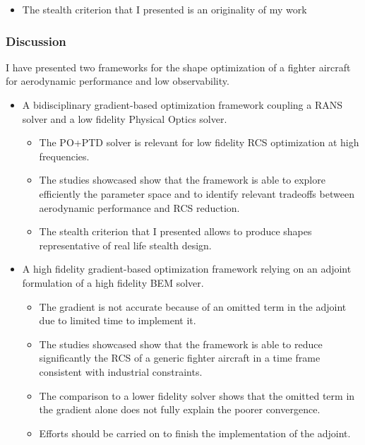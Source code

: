 \documentclass[beamer]{standalone}
\begin{document}
\begin{frame}
\begin{itemize}[label=]
\begin{itemize}[label=$\bullet$]
\begin{itemize}
                \item (12 months)
            \end{itemize}
            \item Study to showcase the framework and postprocessing of the results
            \begin{itemize}
                \item (6 months)
            \end{itemize}
        \end{itemize}
        \item The stealth criterion that I presented is an originality of my work
    \end{itemize}
\end{frame}

\begin{frame}
    \frametitle{Discussion}
    \small
    I have presented two frameworks for the shape optimization of a fighter aircraft for aerodynamic performance and low observability.
    \begin{itemize}[label=]
        \item A bidisciplinary gradient-based optimization framework coupling a RANS solver and a low fidelity Physical Optics solver.
        {
        \begin{itemize}[label=$\bullet$]
            \item The PO+PTD solver is relevant for low fidelity RCS optimization at high frequencies.
            \item The studies showcased show that the framework is able to explore efficiently the parameter space and to identify relevant tradeoffs between aerodynamic performance and RCS reduction.
            \item The stealth criterion that I presented allows to produce shapes representative of real life stealth design.
        \end{itemize}
        }
        \item A high fidelity gradient-based optimization framework relying on an adjoint formulation of a high fidelity BEM solver.
        \begin{itemize}[label=$\bullet$]
            \item The gradient is not accurate because of an omitted term in the adjoint due to limited time to implement it.
            \item The studies showcased show that the framework is able to reduce significantly the RCS of a generic fighter aircraft in a time frame consistent with industrial constraints.
            \item The comparison to a lower fidelity solver shows that the omitted term in the gradient alone does not fully explain the poorer convergence.
            \item Efforts should be carried on to finish the implementation of the adjoint.
        \end{itemize}
    \end{itemize}
\end{frame}
\end{document}
